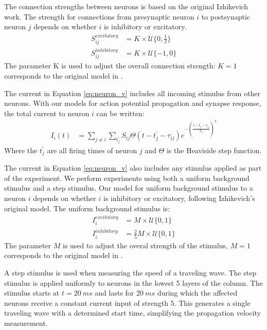 \documentclass[a4paper,11pt]{article}
\begin{document}
The connection strengths between neurons is based on the original Izhikevich work.
The strength for connections from presynaptic neuron $i$ to postsynaptic neuron $j$ depends on whether $i$ is inhibitory or excitatory.
\begin{align}
 S_{ij}^{excitatory} &= K \times \mathcal{U}\{0,\frac{1}{2} \} \\
 S_{ij}^{inhibitory} &= K \times \mathcal{U}\{-1,0 \} 
\end{align}
The parameter K is used to adjust the overall connection strength: $K=1$ corresponds to the original model in \cite{izzy_code}. 

The current in Equation \ref{eq:neuron_v} includes all incoming stimulus from other neurons.
With our models for action potential propagation and synapse response, the total current to neuron $i$ can be written:
\begin{align}
 I_i(t) &= \sum_{j\ne i} \sum_{t^\prime_j} S_{ij}  \Theta(t-t^\prime_j-\tau_{ij})e^{-(\frac{t-t^\prime_j-\tau_{ij}}{\sigma_s})^2}
\end{align}
Where the $t^\prime_j$ are all firing times of neuron $j$ and $\Theta$ is the Heaviside step function.

The current in Equation \ref{eq:neuron_v} also includes any stimulus applied as part of the experiment.
We perform experiments using both a uniform background stimulus and a step stimulus.
Our model for uniform background stimulus to a neuron $i$ depends on whether $i$ is inhibitory or excitatory, following Izhikevich's original model.
The uniform background stimulus is:
\begin{align}
 I_i^{excitatory} &= M \times \mathcal{U}\{0,1 \} \\
 I_i^{inhibitory} &= \frac{2}{5} M \times \mathcal{U}\{0,1 \}
\end{align}
The parameter $M$ is used to adjust the overal strength of the stimulus, $M=1$ corresponds to the original model in \cite{izzy_code}.

A step stimulus is used when measuring the speed of a traveling wave.
The step stimulus is applied uniformly to neurons in the lowest 5 layers of the column.
The stimulus starts at $t=20~ms$ and lasts for $20~ms$ during which the affected neurons receive a constant current input of strength 5.
This generates a single traveling wave with a determined start time, simplifying the propagation velocity measurement.
\end{document}
